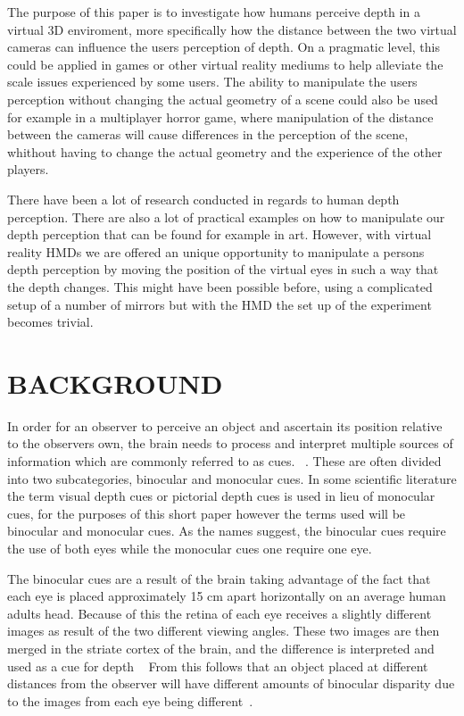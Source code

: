 \documentclass[tog]{acmsiggraph}
\begin{document}
The purpose of this paper is to investigate how humans perceive depth in a virtual 3D enviroment, more specifically how the distance between the two virtual cameras can influence the users perception of depth. On a pragmatic level, this could be applied in games or other virtual reality mediums to help alleviate the scale issues experienced by some users. The ability to manipulate the users perception without changing the actual geometry of a scene could also be used for example in a multiplayer horror game, where manipulation of the distance between the cameras will cause differences in the perception of the scene, whithout having to change the actual geometry and the experience of the other players.    

There have been a lot of research conducted in regards to human depth perception. There are also a lot of practical examples on how to manipulate our depth perception that can be found for example in art. However, with virtual reality HMDs we are offered an unique opportunity to manipulate a persons depth perception by moving the position of the virtual eyes in such a way that the depth changes. This might have been possible before, using a complicated setup of a number of mirrors but with the HMD the set up of the experiment becomes trivial.  


\section{BACKGROUND}
In order for an observer to perceive an object and ascertain its position relative to the observers own, the brain needs to process and interpret multiple sources of information which are commonly referred to as cues. ~\cite {Reichelt et al:2010:DPHV}. These are often divided into two subcategories, binocular and monocular cues. In some scientific literature the term visual depth cues or pictorial depth cues is used in lieu of monocular cues, for the purposes of this short paper however the terms used will be binocular and monocular cues. As the names suggest, the binocular cues require the use of both eyes while the monocular cues one require one eye.

The binocular cues are a result of the brain taking advantage of the fact that each eye is placed approximately 15 cm apart horizontally on an average human adults head. Because of this the retina of each eye receives a slightly different images as result of the two different viewing angles. These two images are then merged in the striate cortex of the brain, and the difference is interpreted and used as a cue for depth ~\cite{Reichelt et al:2010:DPHV}   From this follows that an object placed at different distances from the observer will have different amounts of binocular disparity due to the images from each eye being different~\cite {Boyd:2000:DPC}. 
\end{document}
